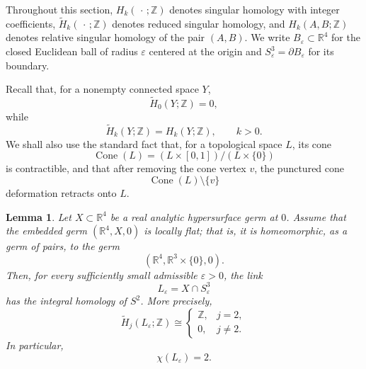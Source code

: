 \documentclass[11pt]{amsart}
\newtheorem{lemma}[theorem]{Lemma}
\theoremstyle{definition}
\theoremstyle{remark}
\begin{document}
Throughout this section, \(H_k(\,\cdot\,;\mathbb Z)\) denotes singular
homology with integer coefficients, \(\widetilde H_k(\,\cdot\,;\mathbb Z)\)
denotes reduced singular homology, and \(H_k(A,B;\mathbb Z)\) denotes
relative singular homology of the pair \((A,B)\). We write
\(B_\varepsilon\subset\mathbb R^4\) for the closed Euclidean ball of radius
\(\varepsilon\) centered at the origin and
\(S^3_\varepsilon=\partial B_\varepsilon\) for its boundary.

Recall that, for a nonempty connected space \(Y\),
\[
\widetilde H_0(Y;\mathbb Z)=0,
\]
while
\[
\widetilde H_k(Y;\mathbb Z)=H_k(Y;\mathbb Z),
\qquad k>0.
\]
We shall also use the standard fact that, for a topological space \(L\), its
cone
\[
\operatorname{Cone}(L)
=
(L\times[0,1])/(L\times\{0\})
\]
is contractible, and that after removing the cone vertex \(v\), the punctured
cone
\[
\operatorname{Cone}(L)\setminus\{v\}
\]
deformation retracts onto \(L\).

\begin{lemma}\label{lem:flat-link-homology}
Let \(X\subset\mathbb R^4\) be a real analytic hypersurface germ at \(0\).
Assume that the embedded germ \((\mathbb R^4,X,0)\) is locally flat; that is,
it is homeomorphic, as a germ of pairs, to the germ
\[
(\mathbb R^4,\mathbb R^3\times\{0\},0).
\]
Then, for every sufficiently small admissible \(\varepsilon>0\), the link
\[
L_\varepsilon=X\cap S^3_\varepsilon
\]
has the integral homology of \(S^2\). More precisely,
\[
\widetilde H_j(L_\varepsilon;\mathbb Z)
\cong
\begin{cases}
\mathbb Z, & j=2,\\
0, & j\ne2.
\end{cases}
\]
In particular,
\[
\chi(L_\varepsilon)=2.
\]
\end{lemma}
\end{document}
